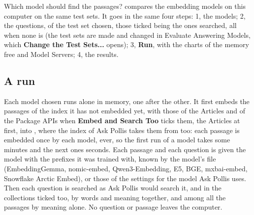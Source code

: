 Which model should find the passages? 
compares the embedding models on this computer on the same test sets. It goes in the same
four steps: 1, the models; 2, the questions, of the test set chosen, those ticked being the ones searched, all when
none is (the test sets are made and changed in Evaluate Answering Models, which \textbf{Change the Test Sets...}
opens); 3, \textbf{Run}, with the charts of the memory free and Model Servers; 4, the results.

\subsection{A run}
Each model chosen runs alone in memory, one after the other. It first embeds the passages of the index it has not
embedded yet, with those of the Articles and of the Package APIs when \textbf{Embed and Search Too} ticks them, the
Articles at first, into , where the index of Ask Pollis takes them from too:
each passage is embedded once by each model, ever, so the first run of a model takes some minutes and the next ones
seconds. Each passage and each question is given the model with the prefixes it was trained with, known by the model's
file (EmbeddingGemma, nomic-embed, Qwen3-Embedding, E5, BGE, mxbai-embed, Snowflake Arctic Embed), or those of the
settings for the model Ask Pollis uses. Then each question is searched as Ask Pollis would search it, and in the
collections ticked too, by words and
meaning together, and among all the passages by meaning alone. No question or passage leaves the computer.

